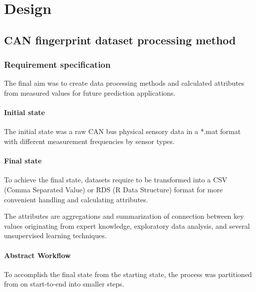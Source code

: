\chapter{Design}
\section{CAN fingerprint dataset processing method}
\subsection{Requirement specification}
	\noindent
The final aim was to create data processing methods and calculated attributes from measured values for future prediction applications.
	\subsubsection{Initial state}
The initial state was a raw CAN bus physical sensory data in a *.mat format with different measurement frequencies by sensor types.
	\subsubsection{Final state}
To achieve the final state, datasets require to be transformed into a CSV (Comma Separated Value) or RDS (R Data Structure) format for more convenient handling and calculating attributes.

The attributes are aggregations and summarization of connection between key values originating from expert knowledge, exploratory data analysis, and several unsupervised learning techniques.
\subsubsection{Abstract Workflow}
To accomplish the final state from the starting state, the process was partitioned from on start-to-end into smaller steps. 


